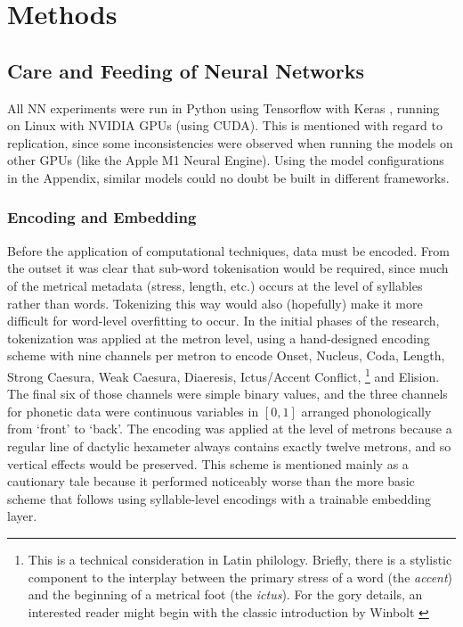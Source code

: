 \documentclass[
    twocolumn,
    hf,
]{ceurart}
\begin{document}
\section{Methods}

\subsection{Care and Feeding of Neural Networks}

All NN experiments were run in Python using Tensorflow
\cite{tensorflow2015-whitepaper} with Keras \cite{chollet2015keras}, running on
Linux with NVIDIA GPUs (using CUDA). This is mentioned with regard to
replication, since some inconsistencies were observed when running the models on
other GPUs (like the Apple M1 Neural Engine). Using the model configurations in
the Appendix, similar models could no doubt be built in different frameworks.

\subsubsection{Encoding and Embedding}\label{sec:embed}

Before the application of computational techniques, data must be encoded. From
the outset it was clear that sub-word tokenisation would be required, since much
of the metrical metadata (stress, length, etc.) occurs at the level of syllables
rather than words. Tokenizing this way would also (hopefully) make it more
difficult for word-level overfitting to occur. In the initial phases of the
research, tokenization was applied at the metron level, using a hand-designed
encoding scheme with nine channels per metron to encode Onset, Nucleus, Coda,
Length, Strong Caesura, Weak Caesura, Diaeresis, Ictus/Accent Conflict,%
%
\footnote{ This is a technical consideration in Latin philology. Briefly, there
    is a stylistic component to the interplay between the primary stress of a
    word (the \emph{accent}) and the beginning of a metrical foot (the
    \emph{ictus}). For the  gory details, an interested reader might begin with
    the classic introduction by Winbolt \cite{winbolt_latin_1903}}
%
and Elision. The final six of those channels were simple binary values, and the
three channels for phonetic data were continuous variables in $[0,1]$ arranged
phonologically from `front' to `back'. The encoding was applied at the level of
metrons because a regular line of dactylic hexameter always contains exactly
twelve metrons, and so vertical effects would be preserved. This scheme is
mentioned mainly as a cautionary tale because it performed noticeably worse than
the more basic scheme that follows using syllable-level encodings with a
trainable embedding layer.
\end{document}

